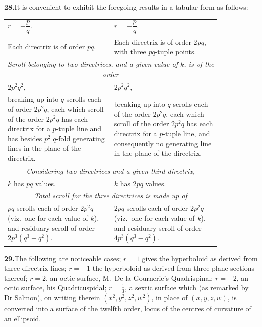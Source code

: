 \documentclass[11pt,a4paper]{article}
\begin{document}
\textbf{28.}\quad It is convenient to exhibit the foregoing results in a
tabular form as follows:
\begin{center}\small
\begin{tabular}{p{0.42\linewidth}|p{0.42\linewidth}}
$r = +\dfrac{p}{q}.$ & $r = -\dfrac{p}{q}.$ \\
Each directrix is of order $pq$.
& Each directrix is of order $2pq$, with three $pq$-tuple points. \\
\hline
\multicolumn{2}{c}{\textit{Scroll belonging to two directrices, and a given
value of $k$, is of the order}} \\
$2p^{2}q^{2}$, & $2p^{2}q^{2}$, \\
breaking up into $q$ scrolls each of order $2p^{2}q$, each which scroll of the
order $2p^{2}q$ has each directrix for a $p$-tuple line and has besides $p^{2}$
$q$-fold generating lines in the plane of the directrix.
& breaking up into $q$ scrolls each of the order $2p^{2}q$, each which scroll
of the order $2p^{2}q$ has each directrix for a $p$-tuple line, and
consequently no generating line in the plane of the directrix. \\
\hline
\multicolumn{2}{c}{\textit{Considering two directrices and a given third
directrix,}} \\
$k$ has $pq$ values. & $k$ has $2pq$ values. \\
\hline
\multicolumn{2}{c}{\textit{Total scroll for the three directrices is made up
of}} \\
$pq$ scrolls each of order $2p^{2}q$ (viz.\ one for each value of $k$), and
residuary scroll of order $2p^{3}(q^{3} - q^{2})$.
& $2pq$ scrolls each of order $2p^{2}q$ (viz.\ one for each value of $k$), and
residuary scroll of order $4p^{3}(q^{3} - q^{2})$.
\end{tabular}
\end{center}

\textbf{29.}\quad The following are noticeable cases; $r = 1$ gives the
hyperboloid as derived from three directrix lines; $r = -1$ the hyperboloid as
derived from three plane sections thereof; $r = 2$, an octic surface,
M.\ De la Gournerie's Quadrispinal; $r = -2$, an octic surface, his
Quadricuspidal; $r = \tfrac{1}{3}$, a sextic surface which (as remarked by
Dr Salmon), on writing therein $(x^{2}, y^{2}, z^{2}, w^{2})$, in place of
$(x, y, z, w)$, is converted into a surface of the twelfth order, locus of
the centres of curvature of an ellipsoid.

\clearpage

\end{document}
